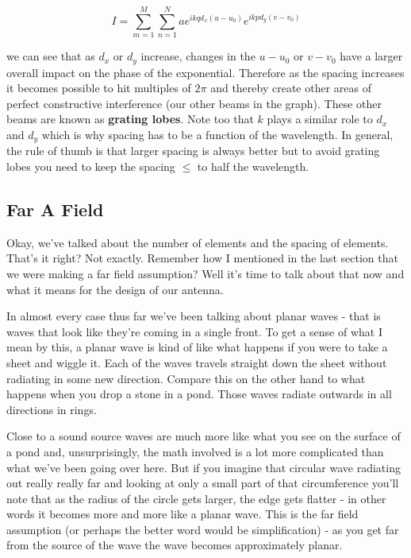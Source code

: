 \documentclass[10pt,a4paper]{article}
\begin{document}
\begin{equation}
I=\sum_{m=1}^M \sum_{n=1}^N  ae^{ikqd_x(u-u_0)}e^{ikpd_y(v-v_0)}
\end{equation}

we can see that as $d_x$ or $d_y$ increase, changes in the $u-u_0$ or $v-v_0$ have a larger overall impact on the phase of the exponential. Therefore as the spacing increases it becomes possible to hit multiples of $2\pi$ and thereby create other areas of perfect constructive interference (our other beams in the graph). These other beams are known as \textbf{grating lobes}. Note too that $k$ plays a similar role to $d_x$ and $d_y$ which is why spacing has to be a function of the wavelength. In general, the rule of thumb is that larger spacing is always better but to avoid grating lobes you need to keep the spacing $\leq$ to half the wavelength. 

\subsection{Far A Field}
Okay, we've talked about the number of elements and the spacing of elements. That's it right? Not exactly. Remember how I mentioned in the last section that we were making a far field assumption? Well it's time to talk about that now and what it means for the design of our antenna. 

In almost every case thus far we've been talking about planar waves - that is waves that look like they're coming in a single front. To get a sense of what I mean by this, a planar wave is kind of like what happens if you were to take a sheet and wiggle it. Each of the waves travels straight down the sheet without radiating in some new direction. Compare this on the other hand to what happens when you drop a stone in a pond. Those waves radiate outwards in all directions in rings. 

Close to a sound source waves are much more like what you see on the surface of a pond and, unsurprisingly, the math involved is a lot more complicated than what we've been going over here. But if you imagine that circular wave radiating out really really far and looking at only a small part of that circumference you'll note that as the radius of the circle gets larger, the edge gets flatter - in other words it becomes more and more like a planar wave. This is the far field assumption (or perhaps the better word would be simplification) - as you get far from the source of the wave the wave becomes approximately planar. 
\end{document}
